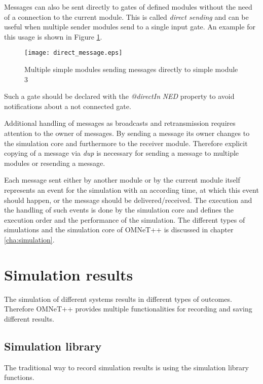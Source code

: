 Messages can also be sent directly to gates of defined modules without the need of a connection to the current module.
This is called \emph{direct sending} and can be useful when multiple sender modules send to a single input gate.
An example for this usage is shown in Figure \ref{fig:direct_sending}.

\begin{figure}
        \centering
        \texttt{[image: direct\_message.eps]}
        \caption{Multiple simple modules sending messages directly to simple module 3}
        \label{fig:direct_sending}
\end{figure}

Such a gate should be declared with the \emph{@directIn} \emph{NED} property to avoid notifications about a not connected gate. \cite[section 4.7.5]{omnet_manual}

Additional handling of messages as broadcasts and retransmission requires attention to the owner of messages.
By sending a message its owner changes to the simulation core and furthermore to the receiver module.
Therefore explicit copying of a message via \emph{dup} is necessary for sending a message to multiple modules or resending a message. \cite[section 4.7.3]{omnet_manual}

Each message sent either by another module or by the current module itself represents an event for the simulation with an according time, at which this event should happen, or the message should be delivered/received.
The execution and the handling of such events is done by the simulation core and defines the execution order and the performance of the simulation.
The different types of simulations and the simulation core of OMNeT++ is discussed in chapter \ref{cha:simulation}.


\section{Simulation results}
\label{sec:omnet_results}
The simulation of different systems results in different types of outcomes.
Therefore OMNeT++ provides multiple functionalities for recording and saving different results.


\subsection{Simulation library}
\label{sec:omnet_results_sim_lib}
The traditional way to record simulation results is using the simulation library functions.

